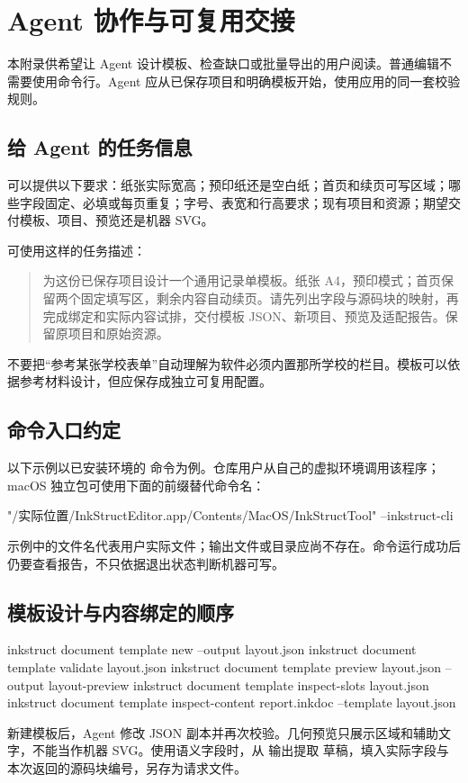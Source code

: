 \chapter{Agent 协作与可复用交接}\label{ch:agent}
本附录供希望让 Agent 设计模板、检查缺口或批量导出的用户阅读。普通编辑不需要使用命令行。Agent 应从已保存项目和明确模板开始，使用应用的同一套校验规则。

\section{给 Agent 的任务信息}
可以提供以下要求：纸张实际宽高；预印纸还是空白纸；首页和续页可写区域；哪些字段固定、必填或每页重复；字号、表宽和行高要求；现有项目和资源；期望交付模板、项目、预览还是机器 SVG。

可使用这样的任务描述：
\begin{quote}
为这份已保存项目设计一个通用记录单模板。纸张 A4，预印模式；首页保留两个固定填写区，剩余内容自动续页。请先列出字段与源码块的映射，再完成绑定和实际内容试排，交付模板 JSON、新项目、预览及适配报告。保留原项目和原始资源。
\end{quote}
不要把“参考某张学校表单”自动理解为软件必须内置那所学校的栏目。模板可以依据参考材料设计，但应保存成独立可复用配置。

\section{命令入口约定}
以下示例以已安装环境的  命令为例。仓库用户从自己的虚拟环境调用该程序；macOS 独立包可使用下面的前缀替代命令名：
\par\noindent\begin{minipage}{\linewidth}
\begin{Source}
"/实际位置/InkStructEditor.app/Contents/MacOS/InkStructTool" --inkstruct-cli
\end{Source}
\end{minipage}\par\medskip
示例中的文件名代表用户实际文件；输出文件或目录应尚不存在。命令运行成功后仍要查看报告，不只依据退出状态判断机器可写。

\section{模板设计与内容绑定的顺序}
\par\noindent\begin{minipage}{\linewidth}
\begin{Source}
inkstruct document template new --output layout.json
inkstruct document template validate layout.json
inkstruct document template preview layout.json --output layout-preview
inkstruct document template inspect-slots layout.json
inkstruct document template inspect-content report.inkdoc --template layout.json
\end{Source}
\end{minipage}\par\medskip
新建模板后，Agent 修改 JSON 副本并再次校验。几何预览只展示区域和辅助文字，不能当作机器 SVG。使用语义字段时，从  输出提取  草稿，填入实际字段与本次返回的源码块编号，另存为请求文件。


